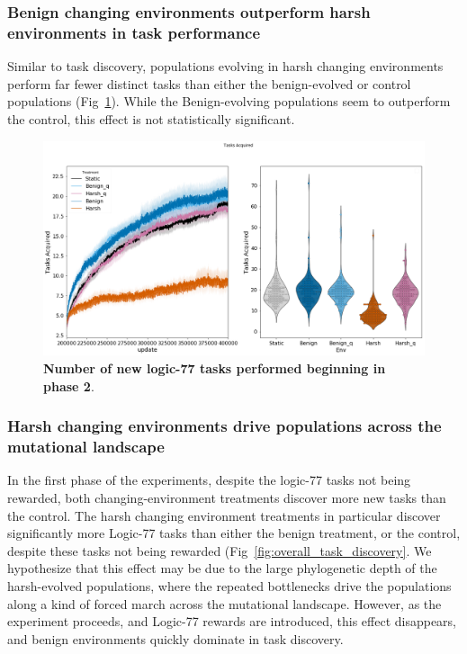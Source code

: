 \documentclass[PhD]{msu-thesis}
\begin{document}
 

\subsubsection{Benign changing environments outperform harsh environments in task performance}
Similar to task discovery, populations evolving in harsh changing environments perform far fewer distinct tasks than either the benign-evolved or control populations (Fig~\ref{fig:lte-task_performance}). While the Benign-evolving populations seem to outperform the control, this effect is not statistically significant. 

	\begin{figure}[!h]
	\includegraphics[trim={0 0 0 0}, clip, width=0.75\columnwidth]{figures/LTE/lte-simple-post_reward_task_performance.png}
	\caption{\textbf{Number of new logic-77 tasks performed beginning in phase 2}.%
	}
	\label{fig:lte-task_performance}
	\end{figure}  


\subsubsection{Harsh changing environments drive populations across the mutational landscape}
In the first phase of the experiments, despite the logic-77 tasks not being rewarded, both changing-environment treatments discover more new tasks than the control. The harsh changing environment treatments in particular discover significantly more Logic-77 tasks than either the benign treatment, or the control, despite these tasks not being rewarded (Fig~\ref{fig:overall_task_discovery}. We hypothesize that this effect may be due to the large phylogenetic depth of the harsh-evolved populations, where the repeated bottlenecks drive the populations along a kind of forced march across the mutational landscape. However, as the experiment proceeds, and Logic-77 rewards are introduced, this effect disappears, and benign environments quickly dominate in task discovery.
\end{document}
